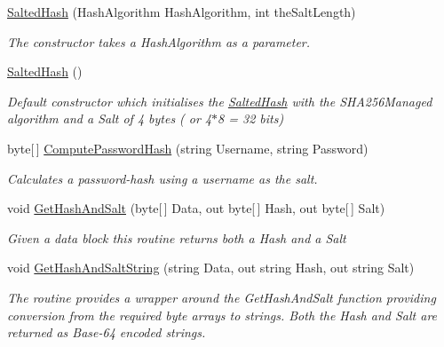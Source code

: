 \begin{DoxyCompactItemize}
\item 
\hyperlink{class_gonzo_net_1_1_encryption_1_1_salted_hash_aed20296865d09fd8ca4ebdda96724d07}{Salted\+Hash} (Hash\+Algorithm Hash\+Algorithm, int the\+Salt\+Length)
\begin{DoxyCompactList}\small\item\em The constructor takes a Hash\+Algorithm as a parameter. \end{DoxyCompactList}\item 
\hyperlink{class_gonzo_net_1_1_encryption_1_1_salted_hash_a0056b1b89927e6b9ed4d824bcaba4449}{Salted\+Hash} ()
\begin{DoxyCompactList}\small\item\em Default constructor which initialises the \hyperlink{class_gonzo_net_1_1_encryption_1_1_salted_hash}{Salted\+Hash} with the S\+H\+A256\+Managed algorithm and a Salt of 4 bytes ( or 4$\ast$8 = 32 bits) \end{DoxyCompactList}\item 
byte\mbox{[}$\,$\mbox{]} \hyperlink{class_gonzo_net_1_1_encryption_1_1_salted_hash_ab6d17fb973a6a98b117e45ef8caab169}{Compute\+Password\+Hash} (string Username, string Password)
\begin{DoxyCompactList}\small\item\em Calculates a password-\/hash using a username as the salt. \end{DoxyCompactList}\item 
void \hyperlink{class_gonzo_net_1_1_encryption_1_1_salted_hash_af555093a6d5f3b8ba1d9a0da017a1434}{Get\+Hash\+And\+Salt} (byte\mbox{[}$\,$\mbox{]} Data, out byte\mbox{[}$\,$\mbox{]} Hash, out byte\mbox{[}$\,$\mbox{]} Salt)
\begin{DoxyCompactList}\small\item\em Given a data block this routine returns both a Hash and a Salt \end{DoxyCompactList}\item 
void \hyperlink{class_gonzo_net_1_1_encryption_1_1_salted_hash_ae3036d39fa48340098aa9681067451ec}{Get\+Hash\+And\+Salt\+String} (string Data, out string Hash, out string Salt)
\begin{DoxyCompactList}\small\item\em The routine provides a wrapper around the Get\+Hash\+And\+Salt function providing conversion from the required byte arrays to strings. Both the Hash and Salt are returned as Base-\/64 encoded strings. \end{DoxyCompactList}\item 

\end{DoxyCompactItemize}
